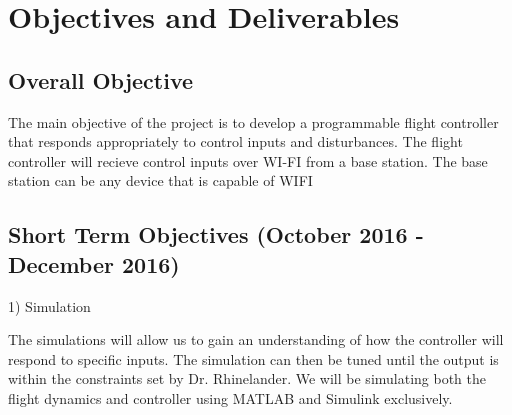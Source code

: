 \section{Objectives and Deliverables}
\subsection{Overall Objective}
The main objective of the project is to develop a programmable flight controller that responds appropriately to control inputs and disturbances. The flight controller will recieve control inputs over WI-FI from a base station. The base station can be any device that is capable of WIFI

\subsection{Short Term Objectives (October 2016 - December 2016)}
1) Simulation

The simulations will allow us to gain an understanding of how the controller will respond to specific inputs. The simulation can then be tuned until the output is within the constraints set by Dr. Rhinelander. We will be simulating both the flight dynamics and controller using MATLAB and Simulink exclusively.  
	
